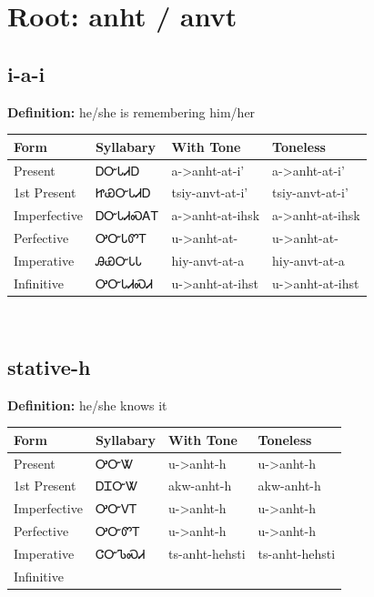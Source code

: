 \documentclass{article}%
\begin{document}
%
\normalsize%
\section*{Root: anht / anvt}%
\subsection*{i-a-i}%
\textbf{Definition: }%
he/she is remembering him/her%
\\[0.5em]%
\begin{tabular}{|l|l|l|l|}%
\hline%
\textbf{Form}&\textbf{Syllabary}&\textbf{With Tone}&\textbf{Toneless}\\%
\hline%
Present&ᎠᏅᏓᏗᎠ&a{-}>anht{-}at{-}i'&a{-}>anht{-}at{-}i'\\%
1st Present&ᏥᏯᏅᏓᏗᎠ&tsiy{-}anvt{-}at{-}i'&tsiy{-}anvt{-}at{-}i'\\%
Imperfective&ᎠᏅᏓᏗᏍᎪᎢ&a{-}>anht{-}at{-}ihsk&a{-}>anht{-}at{-}ihsk\\%
Perfective&ᎤᏅᏓᏛᎢ&u{-}>anht{-}at{-}&u{-}>anht{-}at{-}\\%
Imperative&ᎯᏯᏅᏓᏓ&hiy{-}anvt{-}at{-}a&hiy{-}anvt{-}at{-}a\\%
Infinitive&ᎤᏅᏓᏗᏍᏗ&u{-}>anht{-}at{-}ihst&u{-}>anht{-}at{-}ihst\\%
\hline%
\end{tabular}%
\\[1em]%
\subsection*{stative-h}%
\textbf{Definition: }%
he/she knows it%
\\[0.5em]%
\begin{tabular}{|l|l|l|l|}%
\hline%
\textbf{Form}&\textbf{Syllabary}&\textbf{With Tone}&\textbf{Toneless}\\%
\hline%
Present&ᎤᏅᏔ&u{-}>anht{-}h&u{-}>anht{-}h\\%
1st Present&ᎠᏆᏅᏔ&akw{-}anht{-}h&akw{-}anht{-}h\\%
Imperfective&ᎤᏅᏙᎢ&u{-}>anht{-}h&u{-}>anht{-}h\\%
Perfective&ᎤᏅᏛᎢ&u{-}>anht{-}h&u{-}>anht{-}h\\%
Imperative&ᏣᏅᏖᏍᏗ&ts{-}anht{-}hehsti&ts{-}anht{-}hehsti\\%
Infinitive&&&\\%
\hline%
\end{tabular}%
\\[1em]%
\end{document}
